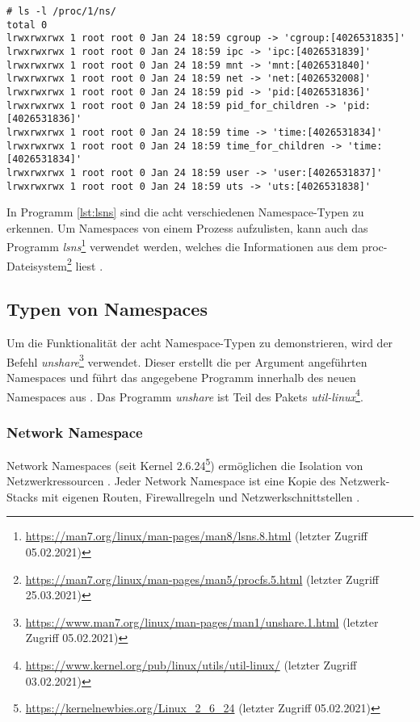 \newpage
\begin{lstlisting}[label={lst:lsns},caption=Namespaces denen der Prozess mit der PID 1 zugehörig ist]
# ls -l /proc/1/ns/
total 0
lrwxrwxrwx 1 root root 0 Jan 24 18:59 cgroup -> 'cgroup:[4026531835]'
lrwxrwxrwx 1 root root 0 Jan 24 18:59 ipc -> 'ipc:[4026531839]'
lrwxrwxrwx 1 root root 0 Jan 24 18:59 mnt -> 'mnt:[4026531840]'
lrwxrwxrwx 1 root root 0 Jan 24 18:59 net -> 'net:[4026532008]'
lrwxrwxrwx 1 root root 0 Jan 24 18:59 pid -> 'pid:[4026531836]'
lrwxrwxrwx 1 root root 0 Jan 24 18:59 pid_for_children -> 'pid:[4026531836]'
lrwxrwxrwx 1 root root 0 Jan 24 18:59 time -> 'time:[4026531834]'
lrwxrwxrwx 1 root root 0 Jan 24 18:59 time_for_children -> 'time:[4026531834]'
lrwxrwxrwx 1 root root 0 Jan 24 18:59 user -> 'user:[4026531837]'
lrwxrwxrwx 1 root root 0 Jan 24 18:59 uts -> 'uts:[4026531838]'
\end{lstlisting}
In Programm \ref{lst:lsns} sind die acht verschiedenen Namespace-Typen zu
erkennen. Um \linebreak Namespaces von einem Prozess aufzulisten, kann auch das
Programm
\emph{lsns}\footnote{\url{https://man7.org/linux/man-pages/man8/lsns.8.html}
(letzter Zugriff 05.02.2021)} verwendet werden, welches die Informationen aus
dem
proc-Dateisystem\footnote{\url{https://man7.org/linux/man-pages/man5/procfs.5.html}
(letzter Zugriff 25.03.2021)} liest \cite{man_lsns}.


\subsection{Typen von Namespaces}
Um die Funktionalität der acht Namespace-Typen zu demonstrieren, wird der
Befehl
\emph{unshare}\footnote{\url{https://www.man7.org/linux/man-pages/man1/unshare.1.html}
(letzter Zugriff 05.02.2021)} verwendet. Dieser erstellt die per Argument
angeführten Namespaces und führt das angegebene Programm innerhalb des neuen
Namespaces aus \cite{man_unshare_1}. Das Programm \emph{unshare} ist Teil des
Pakets
\emph{util-linux}\footnote{\url{https://www.kernel.org/pub/linux/utils/util-linux/}
(letzter Zugriff 03.02.2021)}.

\subsubsection{Network Namespace}
Network Namespaces (seit Kernel
2.6.24\footnote{\url{https://kernelnewbies.org/Linux_2_6_24} (letzter Zugriff
05.02.2021)}) ermöglichen die Isolation von Netzwerkressourcen
\cite{man_network_namespaces}. Jeder Network Namespace ist eine Kopie des
Netzwerk-Stacks mit eigenen Routen, Firewallregeln und Netzwerkschnittstellen
\cite{man_ip_netns}.

